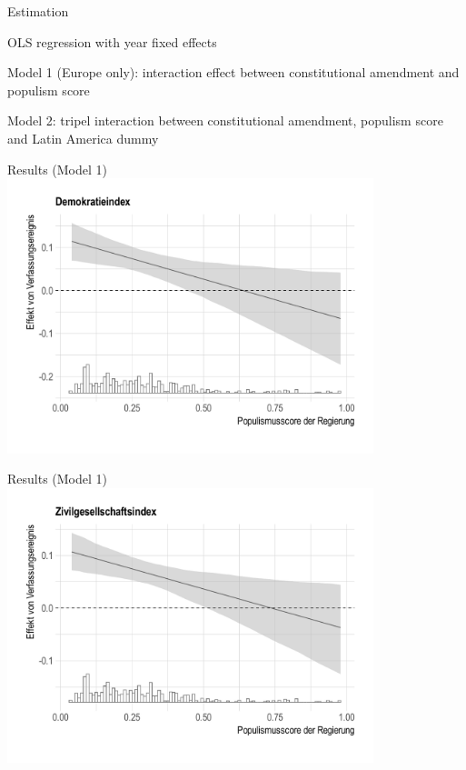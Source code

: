 \documentclass[xcolor=dvipsnames,aspectratio=169,12pt]{beamer}
\begin{document}
\begin{frame}{Estimation}
\begin{wideitemize}
    \item OLS regression with year fixed effects
    \item Model 1 (Europe only): interaction effect between constitutional amendment and populism score
    \item Model 2: tripel interaction between constitutional amendment, populism score and Latin America dummy
\end{wideitemize} 
\end{frame}

\begin{frame}{Results (Model 1)}
    \centering
    \includegraphics[width=0.8\textwidth]{fig/populismscoreregI}
\end{frame}

\begin{frame}{Results (Model 1)}
    \centering
    \includegraphics[width=0.8\textwidth]{fig/populismscoreregII}
\end{frame}
\end{document}
